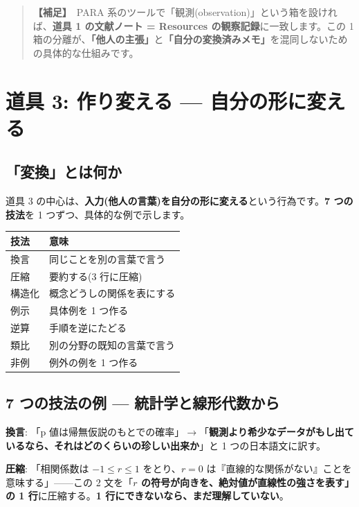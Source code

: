 \documentclass{article}
\begin{document}
\begin{quote}
\textbf{【補足】}\ PARA 系のツールで「観測(observation)」という箱を設ければ、\textbf{道具 1 の文献ノート = Resources の観察記録}に一致します。この 1 箱の分離が、\textbf{「他人の主張」}と\textbf{「自分の変換済みメモ」}を混同しないための具体的な仕組みです。
\end{quote}

\section{道具 3: 作り変える — 自分の形に変える}

\subsection{「変換」とは何か}

道具 3 の中心は、\textbf{入力(他人の言葉)を自分の形に変える}という行為です。\textbf{7 つの技法}を 1 つずつ、具体的な例で示します。

\begin{center}
\begin{tabular}{|l|l|}
\hline
技法 & 意味 \\
\hline
換言 & 同じことを別の言葉で言う \\
\hline
圧縮 & 要約する(3 行に圧縮) \\
\hline
構造化 & 概念どうしの関係を表にする \\
\hline
例示 & 具体例を 1 つ作る \\
\hline
逆算 & 手順を逆にたどる \\
\hline
類比 & 別の分野の既知の言葉で言う \\
\hline
非例 & 例外の例を 1 つ作る \\
\hline
\end{tabular}
\end{center}

\subsection{7 つの技法の例 — 統計学と線形代数から}

\textbf{換言}: 「p 値は帰無仮説のもとでの確率」\(\rightarrow\)「\textbf{観測より希少なデータがもし出ているなら、それはどのくらいの珍しい出来か}」と 1 つの日本語文に訳す。

\textbf{圧縮}: 「相関係数は \(-1 \le r \le 1\) をとり、\(r=0\) は『直線的な関係がない』ことを意味する」——この 2 文を「\textbf{\(r\) の符号が向きを、\textbf{絶対値が直線性の強さ}を表す」の 1 行}に圧縮する。\textbf{1 行にできないなら、まだ理解していない}。
\end{document}
